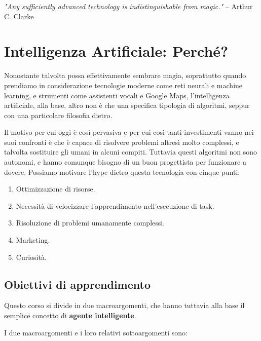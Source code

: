 \begin{center}
        \Large\textit{"Any sufficiently advanced technology is indistinguishable from magic."} -- Arthur C. Clarke
\end{center}

\section{Intelligenza Artificiale: Perché?}    
    Nonostante talvolta possa effettivamente sembrare magia, soprattutto quando prendiamo in considerazione tecnologie moderne come reti neurali e machine learning, e strumenti come assistenti vocali e Google Maps, l'intelligenza artificiale, alla base, altro non è che una specifica tipologia di algoritmi, seppur con una particolare filosofia dietro.
    
    Il motivo per cui oggi è così pervasiva e per cui così tanti investimenti vanno nei suoi confronti è che è capace di risolvere problemi altresì molto complessi, e talvolta sostituire gli umani in alcuni compiti. Tuttavia questi algoritmi non sono autonomi, e hanno comunque bisogno di un buon progettista per funzionare a dovere. Possiamo motivare l'hype dietro questa tecnologia con cinque punti:
    
    \begin{enumerate}
        \item Ottimizzazione di risorse.
        \item Necessità di velocizzare l'apprendimento nell'esecuzione di task.
        \item Risoluzione di problemi umanamente complessi.
        \item Marketing.
        \item Curiosità.
    \end{enumerate}
    
    \subsection{Obiettivi di apprendimento}
        Questo corso si divide in due macroargomenti, che hanno tuttavia alla base il semplice concetto di \textbf{agente intelligente}.
        
        I due macroargomenti e i loro relativi sottoargomenti sono:
        
